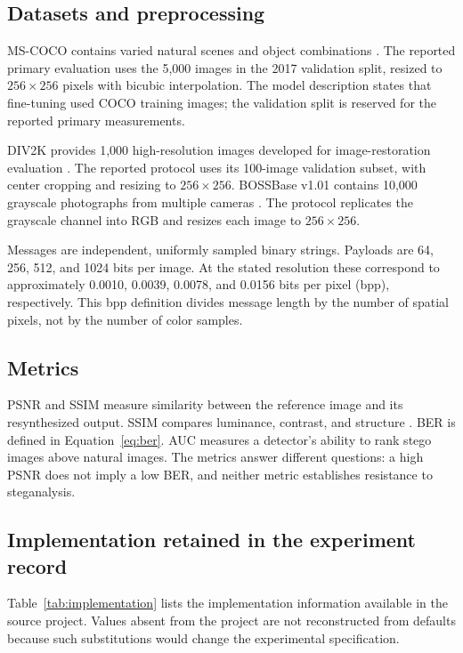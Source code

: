 \documentclass[pdflatex,sn-mathphys-num]{sn-jnl}
\begin{document}
\subsection{Datasets and preprocessing}

MS-COCO contains varied natural scenes and object combinations \cite{lin2014microsoft}. The reported primary evaluation uses the 5,000 images in the 2017 validation split, resized to $256\times256$ pixels with bicubic interpolation. The model description states that fine-tuning used COCO training images; the validation split is reserved for the reported primary measurements.

DIV2K provides 1,000 high-resolution images developed for image-restoration evaluation \cite{agustsson2017ntire}. The reported protocol uses its 100-image validation subset, with center cropping and resizing to $256\times256$. BOSSBase v1.01 contains 10,000 grayscale photographs from multiple cameras \cite{bas2011break}. The protocol replicates the grayscale channel into RGB and resizes each image to $256\times256$.

Messages are independent, uniformly sampled binary strings. Payloads are 64, 256, 512, and 1024 bits per image. At the stated resolution these correspond to approximately 0.0010, 0.0039, 0.0078, and 0.0156 bits per pixel (bpp), respectively. This bpp definition divides message length by the number of spatial pixels, not by the number of color samples.

\subsection{Metrics}

PSNR and SSIM measure similarity between the reference image and its resynthesized output. SSIM compares luminance, contrast, and structure \cite{wang2004image}. BER is defined in Equation~\eqref{eq:ber}. AUC measures a detector's ability to rank stego images above natural images. The metrics answer different questions: a high PSNR does not imply a low BER, and neither metric establishes resistance to steganalysis.

\subsection{Implementation retained in the experiment record}

Table~\ref{tab:implementation} lists the implementation information available in the source project. Values absent from the project are not reconstructed from defaults because such substitutions would change the experimental specification.
\end{document}
